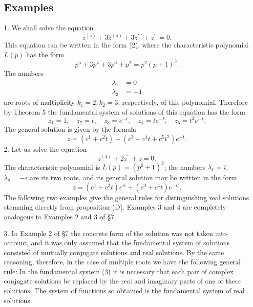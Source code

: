 \documentclass[10pt,a5paper]{book}
\theoremstyle{plain}
\theoremstyle{definition}
\theoremstyle{remark}
\begin{document}
\subsection*{Examples}
1. We shall solve the equation
\[
z^{(5)}+3 z^{(4)}+3 z^{\prime \prime \prime}+z^{\prime \prime}=0 .
\]
This equation can be written in the form (2), where the characteristic polynomial $L(p)$ has the form
\[
p^{5}+3 p^{4}+3 p^{3}+p^{2}=p^{2}(p+1)^{3} .
\]
The numbers
\[
\begin{aligned}
\lambda_{1} & =0 \\
\lambda_{2} & =-1
\end{aligned}
\]
are roots of multiplicity $k_{1}=2, k_{2}=3$, respectively, of this polynomial. Therefore by Theorem 5 the fundamental system of solutions of this equation has the form
\[
z_{1}=1, \quad z_{2}=t, \quad z_{3}=e^{-t}, \quad z_{4}=t e^{-t}, \quad z_{5}=t^{2} e^{-t} .
\]
The general solution is given by the formula
\[
z=\left(c^{1}+c^{2} t\right)+\left(c^{3}+c^{4} t+c^{5} t^{2}\right) e^{-t} .
\]
2. Let us solve the equation
\[
z^{(4)}+2 z^{\prime \prime}+z=0 .
\]
The characteristic polynomial is $L(p)=\left(p^{2}+1\right)^{2}$; the numbers $\lambda_{1}=i$, $\lambda_{2}=-i$ are its two roots, and its general solution may be written in the form
\[
z=\left(c^{1}+c^{2} t\right) e^{i t}+\left(c^{3}+c^{4} t\right) e^{-i t} .
\]
The following two examples give the general rules for distinguishing real solutions stemming directly from proposition (D). Examples 3 and 4 are completely analogous to Examples 2 and 3 of §7.

3. In Example 2 of §7 the concrete form of the solution was not taken into account, and it was only assumed that the fundamental system of solutions consisted of mutually conjugate solutions and real solutions. By the same reasoning, therefore, in the case of multiple roots we have the following general rule: In the fundamental system (3) it is necessary that each pair of complex conjugate solutions be replaced by the real and imaginary parts of one of these solutions. The system of functions so obtained is the fundamental system of real solutions.
\end{document}
